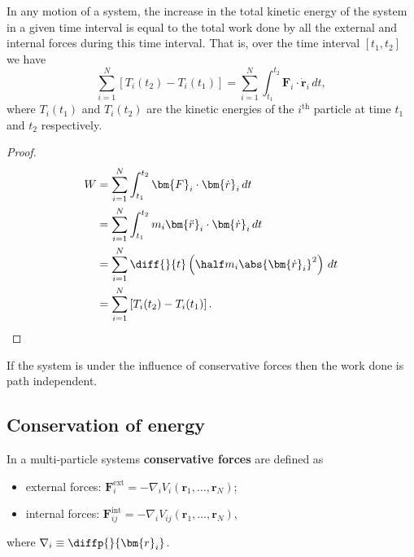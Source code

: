 \documentclass[12pt, a4paper]{article}
\begin{document}
\begin{mdthm}
    In any motion of a system, the increase in the total kinetic energy of the system in a given time interval is equal to the total work done by all the external and internal forces during this time interval. That is, over the time interval \([t_1,t_2]\) we have
    \[\sum_{i=1}^N \left[ T_i(t_2) - T_i(t_1) \right] = \sum_{i=1}^N \int_{t_1}^{t_2} \bm{F}_i \cdot \bm{\dot{r}}_i \, dt,\]
    where \(T_i(t_1)\) and \(T_i(t_2)\) are the kinetic energies of the \(i^{\text{th}}\) particle at time \(t_1\) and \(t_2\) respectively.
\end{mdthm}

\begin{proof}
    \[\begin{aligned}
        W &= \sum_{i=1}^N \int_{t_1}^{t_2} \bm{F}_i \cdot \bm{\dot{r}}_i \, dt \\
        &= \sum_{i=1}^N \int_{t_1}^{t_2} m_i \bm{\ddot{r}}_i \cdot \bm{\dot{r}}_i \, dt \\
        &= \sum_{i=1}^N \diff{}{t} \left( \half m_i \abs{\bm{\dot{r}}_i}^2 \right) \, dt \\
        &= \sum_{i=1}^{N} \left[ T_i(t_2) -T_i(t_1) \right].
    \end{aligned}\]
\end{proof}

\begin{mdcor}
    If the system is under the influence of conservative forces then the work done is path independent.
\end{mdcor}

\subsection{Conservation of energy}

\begin{definition}
    In a multi-particle systems \textbf{conservative forces} are defined as 
    \begin{itemize}
        \item external forces: \(\bm{F}_i^{\text{ext}} = -\nabla_i V_i(\bm{r}_1, \ldots, \bm{r}_N)\);
        \item internal forces: \(\bm{F}_{ij}^{\text{int}} = -\nabla_i V_{ij}(\bm{r}_1, \ldots, \bm{r}_N)\),
    \end{itemize}
    where \(\nabla_i \equiv \diffp{}{{\bm{r}_i}}\).
\end{definition}
\end{document}
